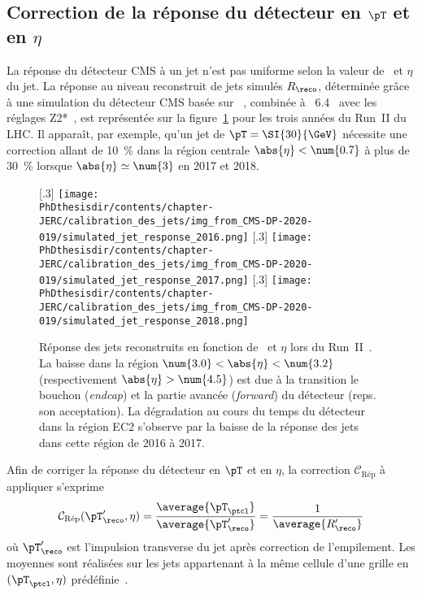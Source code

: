 \subsection{Correction de la réponse du détecteur en $\pT$ et en $\eta$}\label{chapter-JERC-section-CMS-subsec-reponse}
La réponse du détecteur CMS à un jet n'est pas uniforme selon la valeur de \pT\ et $\eta$ du jet.
La réponse au niveau reconstruit de jets simulés $R_\reco$,
déterminée grâce à une simulation du détecteur CMS basée sur \GEANTfour~\cite{geant4},
combinée à \PYTHIA~6.4~\cite{pythia6.4}
avec les réglages Z2*~\cite{Khachatryan:2015pea},
est représentée sur la figure~\ref{fig-simulated_jet_response_RunII} pour les trois années du Run~II du LHC.
Il apparaît, par exemple, qu'un jet de $\pT=\SI{30}{\GeV}$ nécessite une correction allant de \SI{10}{\%} dans la région centrale $\abs{\eta}<\num{0.7}$ à plus de \SI{30}{\%} lorsque $\abs{\eta}\simeq\num{3}$ en 2017 et 2018.
\begin{figure}[h]
\centering
{}[.3\textwidth]
{\texttt{[image: \\PhDthesisdir/contents/chapter-JERC/calibration\_des\_jets/img\_from\_CMS-DP-2020-019/simulated\_jet\_response\_2016.png]}}
\hfill
{}[.3\textwidth]
{\texttt{[image: \\PhDthesisdir/contents/chapter-JERC/calibration\_des\_jets/img\_from\_CMS-DP-2020-019/simulated\_jet\_response\_2017.png]}}
\hfill
{}[.3\textwidth]
{\texttt{[image: \\PhDthesisdir/contents/chapter-JERC/calibration\_des\_jets/img\_from\_CMS-DP-2020-019/simulated\_jet\_response\_2018.png]}}
\caption[Réponse des jets reconstruits en fonction de \pT\ et $\eta$ lors du Run~II.]{Réponse des jets reconstruits en fonction de \pT\ et $\eta$ lors du Run~II~\cite{CMS-DP-2020-019}. La baisse dans la région $\num{3.0}<\abs{\eta}<\num{3.2}$ (respectivement $\abs{\eta}>\num{4.5}$) est due à la transition le bouchon (\emph{endcap}) et la partie avancée (\emph{forward}) du détecteur (reps. son acceptation). La dégradation au cours du temps du détecteur dans la région \og EC2 \fg{} s'observe par la baisse de la réponse des jets dans cette région de 2016 à 2017.}
\label{fig-simulated_jet_response_RunII}
\end{figure}
\par Afin de corriger la réponse du détecteur en $\pT$ et en $\eta$, la correction $\mathcal{C}_\text{Rép}$ à appliquer s'exprime
\begin{equation}
\mathcal{C}_\text{Rép}(\pT_\reco', \eta) = \frac{\average{\pT_\ptcl}}{\average{\pT_\reco'}} = \frac{1}{\average{R_\reco'}}
\end{equation}
où $\pT_\reco'$ est l'impulsion transverse du jet après correction de l'empilement.
Les moyennes sont réalisées sur les jets appartenant à la même cellule d'une grille en $(\pT_\ptcl, \eta)$ prédéfinie~\cite{JERC_RunI}.

